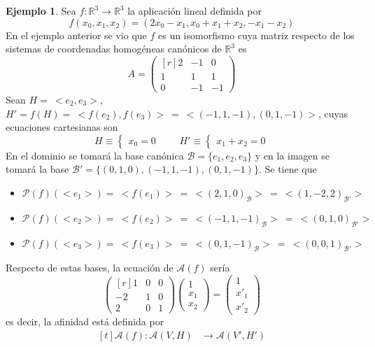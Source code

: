 \documentclass[12pt]{report}
\theoremstyle{definition}
\theoremstyle{definition}
\newtheorem{example}{Ejemplo}[chapter]
\theoremstyle{remark}
\newcommand{\R}{\mathbb R}
\begin{document}
\begin{example}
Sea $f \colon \R^3 \to \R^3$ la aplicación lineal definida por
\[f(x_0,x_1,x_2) = (2x_0-x_1,x_0+x_1+x_2,-x_1-x_2)\]
En el ejemplo anterior se vio que $f$ es un isomorfismo cuya matriz respecto de los sistemas de coordenadas homogéneas canónicos de $\R^3$ es
\[A = \begin{pmatrix*}[r]
    2 & -1 & 0 \\
    1 & 1 &  1 \\
    0 & -1 & -1
\end{pmatrix*}\]
Sean $H = \ <e_2,e_3>$, $H' = f(H) = \ <f(e_2),f(e_3)> \ = \ <(-1,1,-1),(0,1,-1)>$, cuyas ecuaciones cartesianas son
\[H \equiv 
\begin{cases} 
x_0 = 0 
\end{cases} \qquad H' \equiv 
\begin{cases} 
x_1+x_2 = 0 
\end{cases} \]
En el dominio se tomará la base canónica $\mathcal{B} = \{e_1,e_2,e_3\}$ y en la imagen se tomará la base $\mathcal{B'} = \{(0,1,0), (-1,1,-1),(0,1,-1)\}$. Se tiene que
\begin{itemize}
    \item $\mathcal{P}(f)(<e_1>) = \ <f(e_1)> \ = \ <(2,1,0)_\mathcal{B}> \ = \ <(1,-2,2)_\mathcal{B'}>$
    \item $\mathcal{P}(f)(<e_2>) = \ <f(e_2)> \ = \ <(-1,1,-1)_\mathcal{B}> \ = \ <(0,1,0)_\mathcal{B'}>$
    \item $\mathcal{P}(f)(<e_3>) = \ <f(e_3)> \ = \ <(0,1,-1)_\mathcal{B}> \ = \ <(0,0,1)_\mathcal{B'}>$
\end{itemize}
Respecto de estas bases, la ecuación de $\mathcal{A}(f)$ sería
\[
\begin{pmatrix*}[r]
    1 & 0 &  0 \\
    -2 & 1 & 0 \\
    2 & 0 & 1
\end{pmatrix*} \begin{pmatrix*}
    1 \\
    x_1 \\
    x_2
\end{pmatrix*} = \begin{pmatrix*}
    1 \\
    x'_1 \\
    x'_2
\end{pmatrix*}
\]
es decir, la afinidad está definida por
\[
\begin{aligned}[t]
\mathcal{A}(f) \colon \mathcal{A}(V,H) &\longrightarrow \mathcal{A}(V',H') \\

\end{aligned}\]
\end{example}
\end{document}
